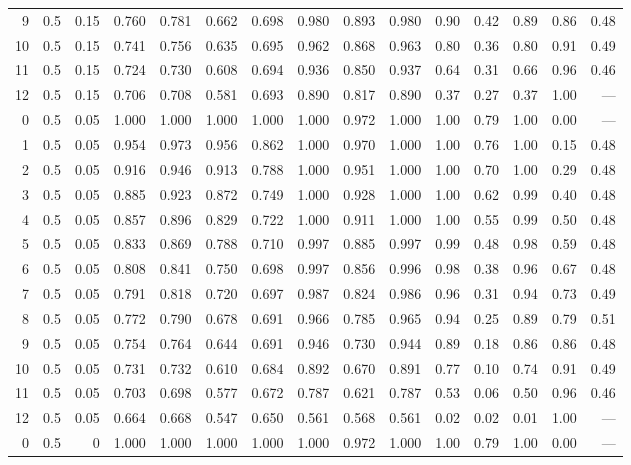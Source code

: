 \begin{landscape}
\begin{longtable}{rrrrrrrrrrrrrrr}
9 & 0.5 & 0.15 & 0.760 & 0.781 & 0.662 & 0.698 & 0.980 & 0.893 & 0.980 & 0.90 & 0.42 & 0.89 & 0.86 & 0.48 \\
10 & 0.5 & 0.15 & 0.741 & 0.756 & 0.635 & 0.695 & 0.962 & 0.868 & 0.963 & 0.80 & 0.36 & 0.80 & 0.91 & 0.49 \\
11 & 0.5 & 0.15 & 0.724 & 0.730 & 0.608 & 0.694 & 0.936 & 0.850 & 0.937 & 0.64 & 0.31 & 0.66 & 0.96 & 0.46 \\
12 & 0.5 & 0.15 & 0.706 & 0.708 & 0.581 & 0.693 & 0.890 & 0.817 & 0.890 & 0.37 & 0.27 & 0.37 & 1.00 & --- \\
\midrule
0 & 0.5 & 0.05 & 1.000 & 1.000 & 1.000 & 1.000 & 1.000 & 0.972 & 1.000 & 1.00 & 0.79 & 1.00 & 0.00 & --- \\
1 & 0.5 & 0.05 & 0.954 & 0.973 & 0.956 & 0.862 & 1.000 & 0.970 & 1.000 & 1.00 & 0.76 & 1.00 & 0.15 & 0.48 \\
2 & 0.5 & 0.05 & 0.916 & 0.946 & 0.913 & 0.788 & 1.000 & 0.951 & 1.000 & 1.00 & 0.70 & 1.00 & 0.29 & 0.48 \\
3 & 0.5 & 0.05 & 0.885 & 0.923 & 0.872 & 0.749 & 1.000 & 0.928 & 1.000 & 1.00 & 0.62 & 0.99 & 0.40 & 0.48 \\
4 & 0.5 & 0.05 & 0.857 & 0.896 & 0.829 & 0.722 & 1.000 & 0.911 & 1.000 & 1.00 & 0.55 & 0.99 & 0.50 & 0.48 \\
5 & 0.5 & 0.05 & 0.833 & 0.869 & 0.788 & 0.710 & 0.997 & 0.885 & 0.997 & 0.99 & 0.48 & 0.98 & 0.59 & 0.48 \\
6 & 0.5 & 0.05 & 0.808 & 0.841 & 0.750 & 0.698 & 0.997 & 0.856 & 0.996 & 0.98 & 0.38 & 0.96 & 0.67 & 0.48 \\
7 & 0.5 & 0.05 & 0.791 & 0.818 & 0.720 & 0.697 & 0.987 & 0.824 & 0.986 & 0.96 & 0.31 & 0.94 & 0.73 & 0.49 \\
8 & 0.5 & 0.05 & 0.772 & 0.790 & 0.678 & 0.691 & 0.966 & 0.785 & 0.965 & 0.94 & 0.25 & 0.89 & 0.79 & 0.51 \\
9 & 0.5 & 0.05 & 0.754 & 0.764 & 0.644 & 0.691 & 0.946 & 0.730 & 0.944 & 0.89 & 0.18 & 0.86 & 0.86 & 0.48 \\
10 & 0.5 & 0.05 & 0.731 & 0.732 & 0.610 & 0.684 & 0.892 & 0.670 & 0.891 & 0.77 & 0.10 & 0.74 & 0.91 & 0.49 \\
11 & 0.5 & 0.05 & 0.703 & 0.698 & 0.577 & 0.672 & 0.787 & 0.621 & 0.787 & 0.53 & 0.06 & 0.50 & 0.96 & 0.46 \\
12 & 0.5 & 0.05 & 0.664 & 0.668 & 0.547 & 0.650 & 0.561 & 0.568 & 0.561 & 0.02 & 0.02 & 0.01 & 1.00 & --- \\
\midrule
0 & 0.5 & 0 & 1.000 & 1.000 & 1.000 & 1.000 & 1.000 & 0.972 & 1.000 & 1.00 & 0.79 & 1.00 & 0.00 & --- \\

\end{longtable}
\end{landscape}
